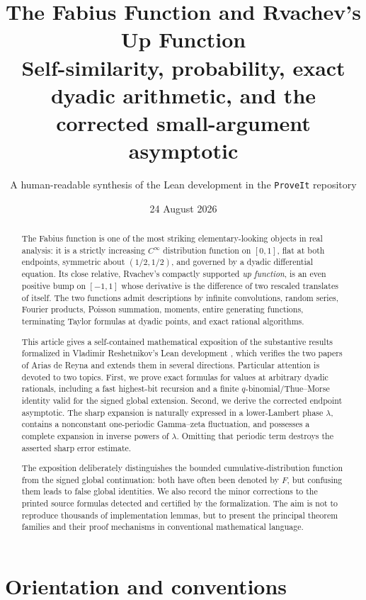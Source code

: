 \documentclass[11pt]{article}
\title{\textbf{The Fabius Function and Rvachev's Up Function}\\[0.5em]
\large Self-similarity, probability, exact dyadic arithmetic, and the corrected small-argument asymptotic}
\author{A human-readable synthesis of the Lean development in the \texttt{ProveIt} repository}
\date{24 August 2026}
\numberwithin{equation}{section}
\theoremstyle{definition}
\theoremstyle{remark}
\begin{document}
\maketitle

\begin{abstract}
The Fabius function is one of the most striking elementary-looking objects in real analysis: it is a strictly increasing $C^\infty$ distribution function on $[0,1]$, flat at both endpoints, symmetric about $(1/2,1/2)$, and governed by a dyadic differential equation.  Its close relative, Rvachev's compactly supported \emph{up function}, is an even positive bump on $[-1,1]$ whose derivative is the difference of two rescaled translates of itself.  The two functions admit descriptions by infinite convolutions, random series, Fourier products, Poisson summation, moments, entire generating functions, terminating Taylor formulas at dyadic points, and exact rational algorithms.

This article gives a self-contained mathematical exposition of the substantive results formalized in Vladimir Reshetnikov's Lean development \cite{ProveIt}, which verifies the two papers of Arias de Reyna \cite{Arias05442,Arias06487} and extends them in several directions.  Particular attention is devoted to two topics.  First, we prove exact formulas for values at arbitrary dyadic rationals, including a fast highest-bit recursion and a finite $q$-binomial/Thue--Morse identity valid for the signed global extension.  Second, we derive the corrected endpoint asymptotic.  The sharp expansion is naturally expressed in a lower-Lambert phase $\lambda$, contains a nonconstant one-periodic Gamma--zeta fluctuation, and possesses a complete expansion in inverse powers of $\lambda$.  Omitting that periodic term destroys the asserted sharp error estimate.

The exposition deliberately distinguishes the bounded cumulative-distribution function from the signed global continuation: both have often been denoted by $F$, but confusing them leads to false global identities.  We also record the minor corrections to the printed source formulas detected and certified by the formalization.  The aim is not to reproduce thousands of implementation lemmas, but to present the principal theorem families and their proof mechanisms in conventional mathematical language.
\end{abstract}

\tableofcontents
\newpage

\section{Orientation and conventions}
\end{document}
